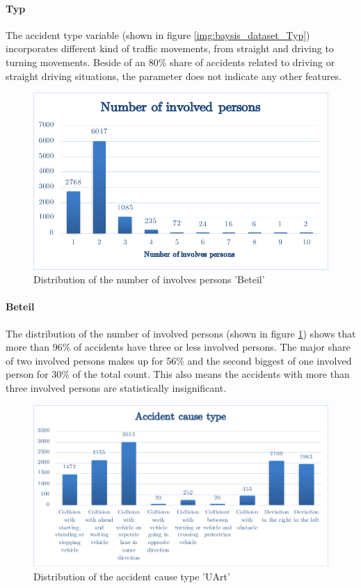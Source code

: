 \documentclass[a4paper,12pt]{report}
\begin{document}
\paragraph{Typ}
The accident type variable (shown in figure \ref{img:baysis_dataset_Typ}) incorporates different kind of traffic movements, from straight and driving to turning movements. Beside of an 80\% share of accidents related to driving or straight driving situations, the parameter does not indicate any other features.

\begin{figure}[H]
	\centering
	\includegraphics[scale=0.6]{./assets/baysis_dataset_Beteil.pdf}
	\caption{Distribution of the number of involves persons 'Beteil'}
	\label{img:baysis_dataset_Beteil}
\end{figure}

\paragraph{Beteil}
The distribution of the number of involved persons (shown in figure \ref{img:baysis_dataset_Beteil}) shows that more than 96\% of accidents have three or less involved persons. The major share of two involved persons makes up for 56\% and the second biggest of one involved person for 30\% of the total count. This also means the accidents with more than three involved persons are statistically insignificant.

\begin{figure}[h]
	\centering
	\includegraphics[scale=0.6]{./assets/baysis_dataset_UArt.pdf}
	\caption{Distribution of the accident cause type 'UArt'}
	\label{img:baysis_dataset_UArt}
\end{figure}
\end{document}
